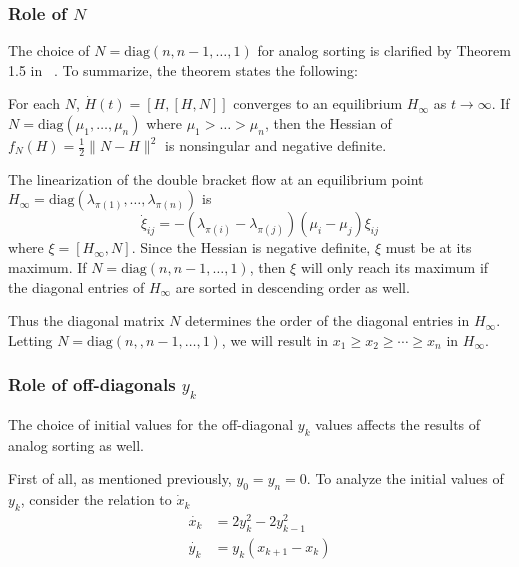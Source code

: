 

%


\subsubsection{Role of $N$}
The choice of $N = \text{diag} (n, n-1, \dots, 1)$ for analog sorting is clarified by Theorem 1.5 in ~\cite{helmke}. To summarize, the theorem states the following: 

For each $N$,  $\dot{H}(t) = [H,[H,N]]$ converges to an equilibrium $H_\infty$ as $t\rightarrow \infty$. If $N=\text{diag} (\mu_1 , \dots , \mu_n)$ where $\mu_1 > \dots > \mu_n$, then the Hessian of $f_N(H) = \frac{1}{2}\|N-H\|^2$ is nonsingular and negative definite. 

The linearization of the double bracket flow at an equilibrium point $H_\infty = \text{diag}(\lambda_{\pi(1)},\dots,\lambda_{\pi(n)})$ is 
\[\dot \xi_{ij} = -(\lambda_{\pi(i)}-\lambda_{\pi(j)})(\mu_i-\mu_j)\xi_{ij}\]
where $\xi = [H_\infty, N]$. Since the Hessian is negative definite, $\xi$ must be at its maximum. If $N = \text{diag} (n, n-1, \dots, 1)$, then $\xi$ will only reach its maximum if the diagonal entries of $H_\infty$ are sorted in descending order as well.

Thus the diagonal matrix $N$ determines the order of the diagonal entries in $H_\infty$. Letting $N = \text{diag}(n, ,n-1, \dots, 1)$, we will result in $x_1 \geq x_2 \geq \cdots \geq x_n$ in $H_\infty$.

\subsubsection{Role of off-diagonals $y_k$}
The choice of initial values for the off-diagonal $y_k$ values affects the results of analog sorting as well. 

First of all, as mentioned previously, $y_0=y_n=0$.
To analyze the initial values of $y_k$, consider the relation to $\dot x_k$
\begin{align*}
    \dot{x_k} &=  2y^2_k-2y^2_{k-1} \\
    \dot{y_k} &= y_k(x_{k+1}-x_k) 
\end{align*}

